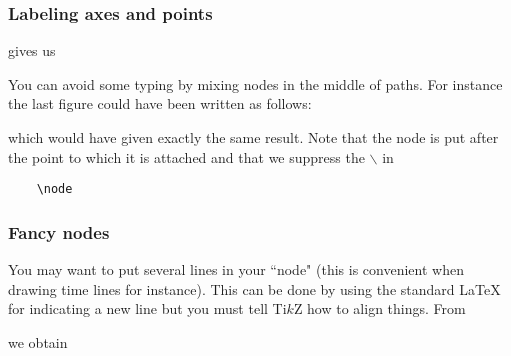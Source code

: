 %
%
\begin{frame}[fragile]
  \frametitle{
    Labeling axes and points
  }

  
  
  gives us
  
  \begin{center}
    
  \end{center}

\end{frame}

%
%
\begin{frame}[fragile]

  You can avoid some typing by mixing nodes in the middle of paths. For instance the last figure could have been written as follows:

  
  
  which would have given exactly the same result. Note that the node is put after the point to which it is attached and that we suppress the $\backslash$ in

  \begin{lstlisting}
    \node
  \end{lstlisting}
  

\end{frame}

%
%
\begin{frame}[containsverbatim]
  \frametitle{
    Fancy nodes
  }

  You may want to put several lines in your ``node" (this is convenient when drawing time lines for instance). This can be done by using the standard \LaTeX\, for indicating a new line but you must tell Ti$k$Z how to align things. From

  {
    \scriptsize
    
  }
  
  we obtain

  \begin{center}
    
  \end{center}
  
\end{frame}
